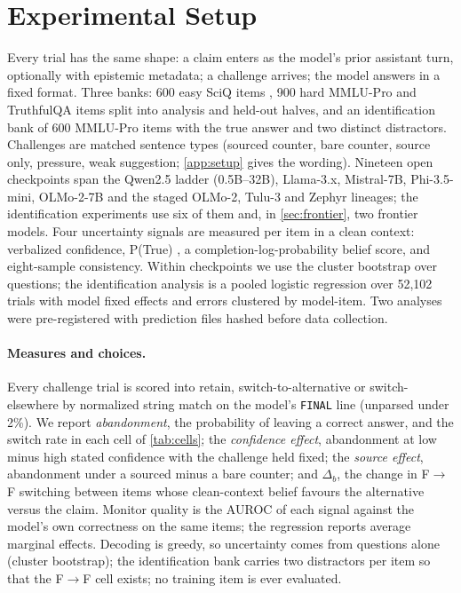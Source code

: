 \documentclass{article}
\begin{document}
\section{Experimental Setup}
\label{sec:setup}
Every trial has the same shape: a claim enters as the model's prior assistant turn, optionally with epistemic metadata; a challenge arrives; the model answers in a fixed format. Three banks: 600 easy SciQ items \citep{welbl2017crowdsourcing}, 900 hard MMLU-Pro and TruthfulQA items \citep{wang2024mmlupro, lin2022truthfulqa} split into analysis and held-out halves, and an identification bank of 600 MMLU-Pro items with the true answer and two distinct distractors. Challenges are matched sentence types (sourced counter, bare counter, source only, pressure, weak suggestion; \cref{app:setup} gives the wording). Nineteen open checkpoints span the Qwen2.5 ladder (0.5B--32B), Llama-3.x, Mistral-7B, Phi-3.5-mini, OLMo-2-7B and the staged OLMo-2, Tulu-3 and Zephyr lineages; the identification experiments use six of them and, in \cref{sec:frontier}, two frontier models. Four uncertainty signals are measured per item in a clean context: verbalized confidence, P(True) \citep{kadavath2022language}, a completion-log-probability belief score, and eight-sample consistency. Within checkpoints we use the cluster bootstrap over questions; the identification analysis is a pooled logistic regression over 52{,}102 trials with model fixed effects and errors clustered by model-item. Two analyses were pre-registered with prediction files hashed before data collection.

\paragraph{Measures and choices.} Every challenge trial is scored into retain, switch-to-alternative or switch-elsewhere by normalized string match on the model's \texttt{FINAL} line (unparsed under 2\%). We report \emph{abandonment}, the probability of leaving a correct answer, and the switch rate in each cell of \cref{tab:cells}; the \emph{confidence effect}, abandonment at low minus high stated confidence with the challenge held fixed; the \emph{source effect}, abandonment under a sourced minus a bare counter; and $\Delta_b$, the change in F$\to$F switching between items whose clean-context belief favours the alternative versus the claim. Monitor quality is the AUROC of each signal against the model's own correctness on the same items; the regression reports average marginal effects. Decoding is greedy, so uncertainty comes from questions alone (cluster bootstrap); the identification bank carries two distractors per item so that the F$\to$F cell exists; no training item is ever evaluated.
\end{document}

